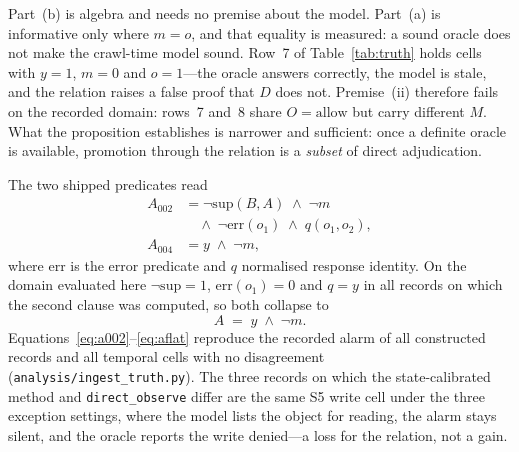 Part~(b) is algebra and needs no premise about the model. Part~(a) is informative only
where $m=o$, and that equality is measured: a sound oracle does not make the crawl-time
model sound. Row~7 of Table~\ref{tab:truth} holds \TvtModelWrong{} cells with $y=1$,
$m=0$ and $o=1$---the oracle answers correctly, the model is stale, and the relation
raises a false proof that $D$ does not. Premise~(ii) therefore fails on the recorded
domain: rows~7 and~8 share $O=\mathrm{allow}$ but carry different $M$. What the
proposition establishes is narrower and sufficient: once a definite oracle is available,
promotion through the relation is a \emph{subset} of direct adjudication.

The two shipped predicates read
\begin{align}
A_{002} &= \neg\mathrm{sup}(B,A)\;\wedge\;\neg m \nonumber\\
        &\quad\wedge\;\neg\mathrm{err}(o_1)\;\wedge\;q(o_1,o_2),\label{eq:a002}\\
A_{004} &= y\;\wedge\;\neg m,\label{eq:a004}
\end{align}
where $\mathrm{err}$ is the error predicate and $q$ normalised response identity. On the
domain evaluated here $\neg\mathrm{sup}=1$, $\mathrm{err}(o_1)=0$ and $q=y$ in all
\TvtMrTwo{} records on which the second clause was computed, so both collapse to
\begin{equation}
A \;=\; y \;\wedge\; \neg m .
\label{eq:aflat}
\end{equation}
Equations~\eqref{eq:a002}--\eqref{eq:aflat} reproduce the recorded alarm of all
\TvtRecords{} constructed records and all \TvtCells{} temporal cells with no disagreement
(\texttt{analysis/ingest\_truth.py}). The three records on which the state-calibrated
method and \texttt{direct\_observe} differ are the same S5 write cell under the three
exception settings, where the model lists the object for reading, the alarm stays silent,
and the oracle reports the write denied---a loss for the relation, not a gain.



